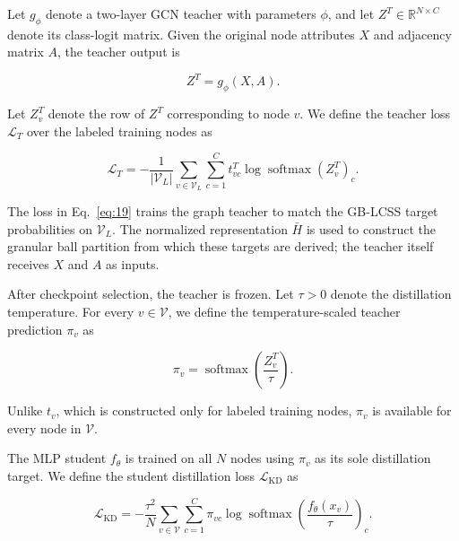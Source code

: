 \documentclass[10pt,letterpaper,nopreprintline]{elsarticle}
\theoremstyle{plain}
\begin{document}
\Needspace{64pt}

Let \(g_{\phi}\) denote a two-layer GCN teacher with parameters \(\phi\), and let \(Z^{T} \in \mathbb{R}^{N \times C}\) denote its class-logit matrix. Given the original node attributes \(X\) and adjacency matrix \(A\), the teacher output is

\begin{equation}\label{eq:18}
Z^{T} = g_{\phi}(X,A).
\end{equation}

\Needspace{64pt}

Let \(Z_{v}^{T}\) denote the row of \(Z^{T}\) corresponding to node \(v\). We define the teacher loss \(\mathcal{L}_{T}\) over the labeled training nodes as

\begin{equation}\label{eq:19}
\mathcal{L}_{T} = - \frac{1}{|\mathcal{V}_{L}|}\sum_{v \in \mathcal{V}_{L}}{\sum_{c = 1}^{C}t_{vc}^{T}}\log\operatorname{softmax}\left( Z_{v}^{T} \right)_{c}.
\end{equation}

The loss in Eq.~\eqref{eq:19} trains the graph teacher to match the GB-LCSS target probabilities on \(\mathcal{V}_{L}\). The normalized representation \(\bar{H}\) is used to construct the granular ball partition from which these targets are derived; the teacher itself receives \(X\) and \(A\) as inputs.

\Needspace{64pt}

After checkpoint selection, the teacher is frozen. Let \(\tau > 0\) denote the distillation temperature. For every \(v \in \mathcal{V}\), we define the temperature-scaled teacher prediction \(\pi_{v}\) as

\begin{equation}\label{eq:20}
\pi_{v} = \operatorname{softmax}\left( \frac{Z_{v}^{T}}{\tau} \right).
\end{equation}

Unlike \(t_{v}\), which is constructed only for labeled training nodes, \(\pi_{v}\) is available for every node in \(\mathcal{V}\).

\Needspace{64pt}

The MLP student \(f_{\theta}\) is trained on all \(N\) nodes using \(\pi_{v}\) as its sole distillation target. We define the student distillation loss \(\mathcal{L}_{\mathrm{KD}}\) as

\begin{equation}\label{eq:21}
\mathcal{L}_{\mathrm{KD}} = - \frac{\tau^{2}}{N}\sum_{v \in \mathcal{V}}{\sum_{c = 1}^{C}\pi_{vc}}\log\operatorname{softmax}\left( \frac{f_{\theta}(x_{v})}{\tau} \right)_{c}.
\end{equation}
\end{document}
